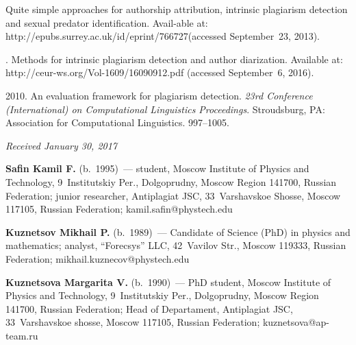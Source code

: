 \begin{multicols}{2}
{{\begin{thebibliography}{99}
Quite simple approaches for authorship attribution, intrinsic plagiarism detection
 and sexual predator identification. 
 Avail-\linebreak able at: 
 {\sf http://epubs.surrey.ac.uk/id/eprint/766727}\linebreak (accessed September~23, 2013).

. 
Methods for intrinsic plagiarism detection and author diarization. 
Available at: 
{\sf http://ceur-ws.org/Vol-1609/16090912.pdf} (accessed September~6, 2016).

 2010.
 An evaluation framework for plagiarism detection. 
 \textit{23rd  Conference (International) on Computational Linguistics 
 Proceedings}. Stroudsburg, PA: 
 Association for Computational Linguistics. 997--1005.
\end{thebibliography}

 }
 }

\end{multicols}

\vspace*{-3pt}

\hfill{\small\textit{Received January 30, 2017}}


\Contr

\noindent
\textbf{Safin Kamil F.} (b.\ 1995)~--- 
student, Moscow Institute of Physics and Technology, 
9~Institutskiy Per., Dolgoprudny, Moscow Region 141700, Russian Federation; 
junior researcher, Antiplagiat JSC,  33~Varshavskoe Shosse, 
Moscow 117105, Russian Federation; \mbox{kamil.safin@phystech.edu}

\noindent
\textbf{Kuznetsov  Mikhail P.} (b.\ 1989)~--- 
Candidate of Science (PhD) in physics and mathematics; 
analyst, ``Forecsys'' LLC, 42~Vavilov Str.,  
Moscow 119333, Russian Federation; \mbox{mikhail.kuznecov@phystech.edu} 


\noindent
\textbf{Kuznetsova Margarita V.} (b.\ 1990)~---
PhD student, Moscow Institute of Physics and Technology, 
9~Institutskiy Per., Dolgoprudny, Moscow Region 141700, Russian Federation; 
Head of Departament, Antiplagiat JSC,  33~Varshavskoe shosse, 
Moscow 117105, Russian Federation; \mbox{kuznetsova@ap-team.ru}

\label{end\stat}


\renewcommand{\bibname}{\protect\rm Литература} 